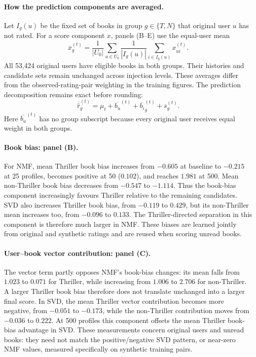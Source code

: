 \paragraph{How the prediction components are averaged.}
Let $I_g(u)$ be the fixed set of books in group $g\in\{T,N\}$ that original user $u$ has not rated. For a score component $x$, panels (B--E) use the equal-user mean
\begin{equation}
\label{eq:prediction_component_average}
\overline{x}_g^{(t)}=
\frac{1}{|U_0|}\sum_{u\in U_0}
\frac{1}{|I_g(u)|}\sum_{i\in I_g(u)}x_{ui}^{(t)}.
\end{equation}
All 53,424 original users have eligible books in both groups. Their histories and candidate sets remain unchanged across injection levels. These averages differ from the observed-rating-pair weighting in the training figures. The prediction decomposition remains exact before rounding:
\begin{equation}
\label{eq:prediction_mean_decomposition}
\overline{\hat r}_g^{(t)}
=\mu_t+\overline{b_u}^{(t)}+\overline{b_i}_g^{(t)}+\overline{s}_g^{(t)}.
\end{equation}
Here $\overline{b_u}^{(t)}$ has no group subscript because every original user receives equal weight in both groups.

\paragraph{Book bias: panel (B).}
For NMF, mean Thriller book bias increases from $-0.605$ at baseline to $-0.215$ at 25 profiles, becomes positive at 50 ($0.102$), and reaches $1.981$ at 500. Mean non-Thriller book bias decreases from $-0.547$ to $-1.114$. Thus the book-bias component increasingly favours Thriller relative to the remaining candidates. SVD also increases Thriller book bias, from $-0.119$ to $0.429$, but its non-Thriller mean increases too, from $-0.096$ to $0.133$. The Thriller-directed separation in this component is therefore much larger in NMF. These biases are learned jointly from original and synthetic ratings and are reused when scoring unread books.

\paragraph{User--book vector contribution: panel (C).}
The vector term partly opposes NMF's book-bias changes: its mean falls from $1.023$ to $0.071$ for Thriller, while increasing from $1.006$ to $2.706$ for non-Thriller. A larger Thriller book bias therefore does not translate unchanged into a larger final score. In SVD, the mean Thriller vector contribution becomes more negative, from $-0.051$ to $-0.173$, while the non-Thriller contribution moves from $-0.036$ to $0.222$. At 500 profiles this component offsets the mean Thriller book-bias advantage in SVD. These measurements concern original users and unread books: they need not match the positive/negative SVD pattern, or near-zero NMF values, measured specifically on synthetic training pairs.

